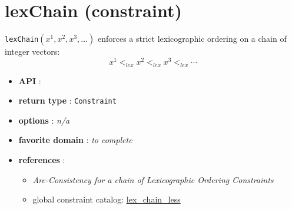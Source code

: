 \label{lexchain}
\hypertarget{lexchain}{}

\section{lexChain (constraint)}\label{lexchain:lexchainconstraint}\hypertarget{lexchain:lexchainconstraint}{}
\begin{notedef}
\texttt{lexChain}$(x^1 ,x^2 ,x^3,\ldots)$ enforces a strict lexicographic ordering on a chain of integer vectors:
$$x^1 <_{lex} x^2 <_{lex} x^3 <_{lex}\cdots$$
\end{notedef}

\begin{itemize}
	\item \textbf{API} : 
	\item \textbf{return type} : \texttt{Constraint}
	\item \textbf{options} : \emph{n/a}
	\item \textbf{favorite domain} : \emph{to complete}
	\item \textbf{references} :
      \begin{itemize}
      \item \cite{BeldiceanuSICS02} \emph{Arc-Consistency for a chain of Lexicographic Ordering Constraints} 
      \item global constraint catalog: \href{http://www.emn.fr/x-info/sdemasse/gccat/Clex_chain_less.html}{lex\_chain\_less}
      \end{itemize}
\end{itemize}
